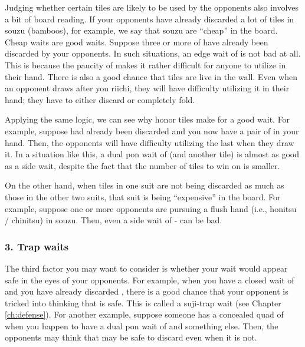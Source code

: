\bigskip
Judging whether certain tiles are likely to be used by the opponents also involves a bit of board reading. If your opponents have already discarded a lot of tiles in {\jap souzu} (bamboos), for example, we say that {\jap souzu} are ``cheap'' in the board. Cheap waits are good waits. Suppose three or more of {\LARGE{}} have already been discarded by your opponents. In such situations, an edge wait of {\LARGE {}} is not bad at all. This is because the paucity of {\LARGE{}} makes it rather difficult for anyone to utilize {\LARGE{}} in their hand. There is also a good chance that {\LARGE{}} tiles are live in the wall. Even when an opponent draws {\LARGE{}} after you riichi, they will have difficulty utilizing it in their hand; they have to either discard {\LARGE{}} or completely fold. 

\bigskip
Applying the same logic, we can see why honor tiles make for a good wait. 
For example, suppose {\LARGE\zhong} had already been discarded and you now have a pair of {\LARGE\zhong} in your hand. Then, the opponents will have difficulty utilizing the last {\LARGE\zhong} when they draw it. In a situation like this, a dual {\jap pon} wait of {\LARGE\zhong} (and another tile) is almost as good as a side wait, despite the fact that the number of tiles to win on is smaller. 

\bigskip
On the other hand, when tiles in one suit are not being discarded as much as those in the other two suits, that suit is being ``expensive'' in the board. For example, suppose one or more opponents are pursuing a flush hand (i.e., {\jap honitsu} / {\jap chinitsu}) in {\jap souzu}. Then, even a side wait of {\LARGE {}-} can be bad. 

\subsubsection{3. Trap waits}

The third factor you may want to consider is whether your wait would appear safe in the eyes of your opponents. For example, when you have a closed wait of {\LARGE{}} and you have already discarded {\LARGE{}}, there is a good chance that your opponent is tricked into thinking that {\LARGE{}} is safe. This is called a {\jap suji}-trap wait (see Chapter \ref{ch:defense}). 
For another example, suppose someone has a concealed quad of {\LARGE{}} when you happen to have a dual {\jap pon} wait of {\LARGE{}} and something else. Then, the opponents may think that {\LARGE{}} may be safe to discard even when it is not. 

